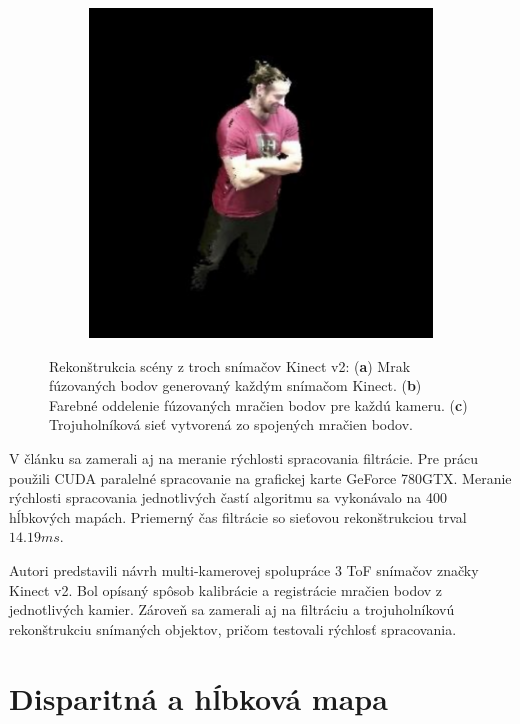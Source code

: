\begin{figure}[H]
\begin{subfigure}[b]{0.315\textwidth}
		\caption{}
		\label{fig:resers:s}
	\end{subfigure}
	\hfill
	\begin{subfigure}[b]{0.32\textwidth}
		\centering
		\includegraphics[width=\textwidth]{figures/resers_t.png}
		\caption{}
		\label{fig:resers:t}
	\end{subfigure}
	\caption{Rekonštrukcia scény z troch snímačov Kinect v2:
		(\textbf{a}) Mrak fúzovaných bodov generovaný každým snímačom Kinect.
		(\textbf{b}) Farebné oddelenie fúzovaných mračien bodov pre každú kameru.
		(\textbf{c}) Trojuholníková sieť vytvorená zo spojených mračien bodov.}
	\label{fig:resers:6}
\end{figure}

V článku sa zamerali aj na meranie rýchlosti spracovania filtrácie. Pre prácu použili CUDA paralelné spracovanie na grafickej karte GeForce 780GTX. 
Meranie rýchlosti spracovania jednotlivých častí algoritmu sa vykonávalo na 400 hĺbkových mapách. Priemerný čas filtrácie so sieťovou rekonštrukciou trval $14.19ms$. 

Autori predstavili návrh multi-kamerovej spolupráce 3 ToF snímačov značky Kinect v2. Bol opísaný spôsob kalibrácie a registrácie mračien bodov z jednotlivých kamier. Zároveň sa zamerali aj na filtráciu a trojuholníkovú rekonštrukciu snímaných objektov, pričom testovali rýchlosť spracovania.

\section{Disparitná a hĺbková mapa}

